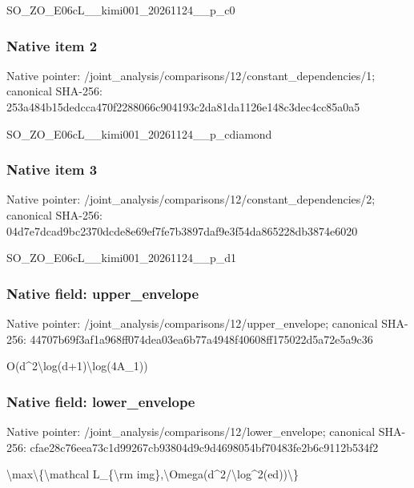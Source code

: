 \documentclass[10pt,a4paper]{article}
\begin{document}
SO\_ZO\_E06cL\_\_kimi001\_20261124\_\_p\_c0


\subsubsection{Native item 2}


Native pointer: /joint\_analysis/comparis\allowbreak{}ons/12/constant\_dependen\allowbreak{}cies/1; canonical SHA-256: 253a484b15dedcca470f2288\allowbreak{}066c904193c2da81da1126e1\allowbreak{}48c3dec4cc85a0a5


SO\_ZO\_E06cL\_\_kimi001\_202\allowbreak{}61124\_\_p\_cdiamond


\subsubsection{Native item 3}


Native pointer: /joint\_analysis/comparis\allowbreak{}ons/12/constant\_dependen\allowbreak{}cies/2; canonical SHA-256: 04d7e7dcad9bc2370dcde8e6\allowbreak{}9ef7fe7b3897daf9e3f54da8\allowbreak{}65228db3874e6020


SO\_ZO\_E06cL\_\_kimi001\_20261124\_\_p\_d1


\subsubsection{Native field: upper\_envelope}


Native pointer: /joint\_analysis/comparis\allowbreak{}ons/12/upper\_envelope; canonical SHA-256: 44707b69f3af1a968ff074de\allowbreak{}a03ea6b77a4948f40608ff17\allowbreak{}5022d5a72e5a9c36


O(d\textasciicircum{}2\textbackslash{}log(d+1)\textbackslash{}log(4A\_1))


\subsubsection{Native field: lower\_envelope}


Native pointer: /joint\_analysis/comparis\allowbreak{}ons/12/lower\_envelope; canonical SHA-256: cfae28c76eea73c1d99267cb\allowbreak{}93804d9c9d4698054bf70483\allowbreak{}fe2b6c9112b534f2


\textbackslash{}max\textbackslash{}\{\textbackslash{}mathcal L\_\{\textbackslash{}rm img\},\textbackslash{}Omega(d\textasciicircum{}2/\textbackslash{}log\textasciicircum{}2(ed))\textbackslash{}\}
\end{document}
